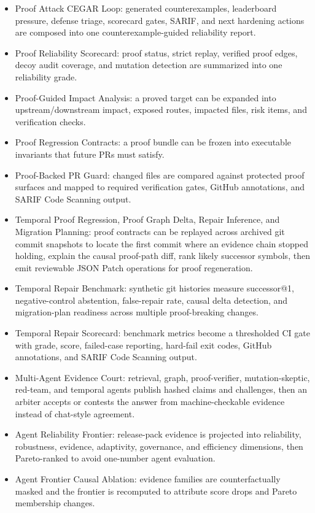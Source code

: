 \documentclass[UTF8,12pt,openany]{ctexbook}
\begin{document}
\begin{itemize}
\item Proof Attack CEGAR Loop: generated counterexamples, leaderboard pressure, defense triage, scorecard gates, SARIF, and next hardening actions are composed into one counterexample-guided reliability report.
\item Proof Reliability Scorecard: proof status, strict replay, verified proof edges, decoy audit coverage, and mutation detection are summarized into one reliability grade.
\item Proof-Guided Impact Analysis: a proved target can be expanded into upstream/downstream impact, exposed routes, impacted files, risk items, and verification checks.
\item Proof Regression Contracts: a proof bundle can be frozen into executable invariants that future PRs must satisfy.
\item Proof-Backed PR Guard: changed files are compared against protected proof surfaces and mapped to required verification gates, GitHub annotations, and SARIF Code Scanning output.
\item Temporal Proof Regression, Proof Graph Delta, Repair Inference, and Migration Planning: proof contracts can be replayed across archived git commit snapshots to locate the first commit where an evidence chain stopped holding, explain the causal proof-path diff, rank likely successor symbols, then emit reviewable JSON Patch operations for proof regeneration.
\item Temporal Repair Benchmark: synthetic git histories measure successor@1, negative-control abstention, false-repair rate, causal delta detection, and migration-plan readiness across multiple proof-breaking changes.
\item Temporal Repair Scorecard: benchmark metrics become a thresholded CI gate with grade, score, failed-case reporting, hard-fail exit codes, GitHub annotations, and SARIF Code Scanning output.
\item Multi-Agent Evidence Court: retrieval, graph, proof-verifier, mutation-skeptic, red-team, and temporal agents publish hashed claims and challenges, then an arbiter accepts or contests the answer from machine-checkable evidence instead of chat-style agreement.
\item Agent Reliability Frontier: release-pack evidence is projected into reliability, robustness, evidence, adaptivity, governance, and efficiency dimensions, then Pareto-ranked to avoid one-number agent evaluation.
\item Agent Frontier Causal Ablation: evidence families are counterfactually masked and the frontier is recomputed to attribute score drops and Pareto membership changes.

\end{itemize}
\end{document}
